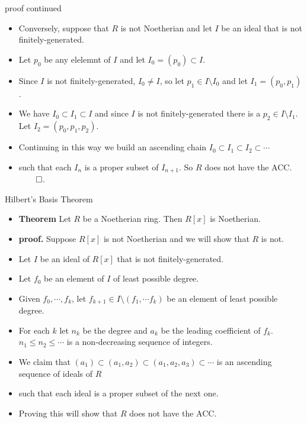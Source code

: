 \documentclass[handout]{beamer}
\begin{document}
\begin{frame}{proof continued}

\begin{itemize}
  \item Conversely, suppose that $R$ is not Noetherian and let $I$ be an ideal that is not finitely-generated.
  \item Let $p_0$ be any elelemnt of $I$ and let $I_0=(p_0)\subset I$.
  \item Since $I$ is not finitely-generated, $I_0\not= I$, so let $p_1 \in I\setminus I_0$ and let $I_1 = (p_0,p_1)$.
  \item We have $I_0 \subset I_1 \subset I$ and since $I$ is not finitely-generated there is a $p_2\in I\setminus I_1$. Let $I_2=(p_0,p_1,p_2)$.
  \item Continuing in this way we build an ascending chain $I_0 \subset  I_1 \subset I_2 \subset \cdots$
  \item such that each $I_n$ is a proper subset of $I_{n+1}$. So $R$ does not have the ACC. $\qed$.

\end{itemize}

\end{frame}



\begin{frame}{Hilbert's Basis Theorem}

\begin{itemize}
  \item \textbf{Theorem} Let $R$ be a Noetherian ring. Then $R[x]$ is Noetherian.
  \item \textbf{proof.} Suppose $R[x]$ is not Noetherian and we will show that $R$ is not.
  \item Let $I$ be an ideal of $R[x]$ that is not finitely-generated.
  \item Let $f_0$ be an element of $I$ of least possible degree.
  \item Given $f_0,\cdots, f_k$, let $f_{k+1} \in I\setminus (f_1,\cdots f_k)$ be an element of least possible degree.
  \item For each $k$ let $n_k$ be the degree and $a_k$ be the leading coefficient of $f_k$. $n_1 \leq n_2 \leq \cdots$ is a non-decreasing sequence of integers.
  \item We claim that $(a_1) \subset (a_1, a_2) \subset (a_1, a_2, a_3) \subset \cdots$ is an ascending sequence of ideals of $R$
  \item such that each ideal is a proper subset of the next one.
  \item Proving this will show that $R$ does not have the ACC.
\end{itemize}
\end{frame}
\end{document}

